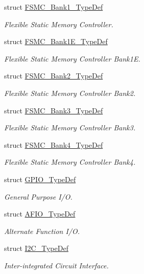 \begin{DoxyCompactItemize}
struct \hyperlink{struct_f_s_m_c___bank1___type_def}{F\-S\-M\-C\-\_\-\-Bank1\-\_\-\-Type\-Def}
\begin{DoxyCompactList}\small\item\em Flexible Static Memory Controller. \end{DoxyCompactList}\item 
struct \hyperlink{struct_f_s_m_c___bank1_e___type_def}{F\-S\-M\-C\-\_\-\-Bank1\-E\-\_\-\-Type\-Def}
\begin{DoxyCompactList}\small\item\em Flexible Static Memory Controller Bank1\-E. \end{DoxyCompactList}\item 
struct \hyperlink{struct_f_s_m_c___bank2___type_def}{F\-S\-M\-C\-\_\-\-Bank2\-\_\-\-Type\-Def}
\begin{DoxyCompactList}\small\item\em Flexible Static Memory Controller Bank2. \end{DoxyCompactList}\item 
struct \hyperlink{struct_f_s_m_c___bank3___type_def}{F\-S\-M\-C\-\_\-\-Bank3\-\_\-\-Type\-Def}
\begin{DoxyCompactList}\small\item\em Flexible Static Memory Controller Bank3. \end{DoxyCompactList}\item 
struct \hyperlink{struct_f_s_m_c___bank4___type_def}{F\-S\-M\-C\-\_\-\-Bank4\-\_\-\-Type\-Def}
\begin{DoxyCompactList}\small\item\em Flexible Static Memory Controller Bank4. \end{DoxyCompactList}\item 
struct \hyperlink{struct_g_p_i_o___type_def}{G\-P\-I\-O\-\_\-\-Type\-Def}
\begin{DoxyCompactList}\small\item\em General Purpose I/\-O. \end{DoxyCompactList}\item 
struct \hyperlink{struct_a_f_i_o___type_def}{A\-F\-I\-O\-\_\-\-Type\-Def}
\begin{DoxyCompactList}\small\item\em Alternate Function I/\-O. \end{DoxyCompactList}\item 
struct \hyperlink{struct_i2_c___type_def}{I2\-C\-\_\-\-Type\-Def}
\begin{DoxyCompactList}\small\item\em Inter-\/integrated Circuit Interface. \end{DoxyCompactList}\item 

\end{DoxyCompactItemize}
